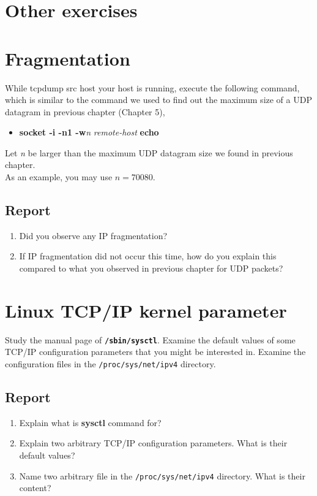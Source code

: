 \documentclass{../UTNetLab}
\begin{document}
\section*{Other exercises}
\section{Fragmentation}
    While tcpdump src host your host is running, execute the following command, which is similar to the command we used to find out the maximum size of a UDP datagram in previous chapter (Chapter 5),
    \begin{itemize}
        \item \textbf{socket -i -n1 -w}\textit{n} \textit{remote-host} \textbf{echo} 
    \end{itemize}
    Let \textit{n} be larger than the maximum UDP datagram size we found in previous chapter. \\
    As an example, you may use $n = 70080$.
    \subsection*{Report}
    \begin{enumerate}
        \item Did you observe any IP fragmentation?
        \item If IP fragmentation did not occur this time, how do you explain this compared to what you observed in previous chapter for UDP packets?
    \end{enumerate}

\section{Linux TCP/IP kernel parameter}
    Study the manual page of \textbf{\texttt{/sbin/sysctl}}.
    Examine the default values of some TCP/IP configuration parameters that you might be interested in.
    Examine the configuration files in the \texttt{/proc/sys/net/ipv4} directory.
    \subsection*{Report}
    \begin{enumerate}
        \item Explain what is \textbf{sysctl} command for?
        \item Explain two arbitrary TCP/IP configuration parameters. What is their default values?
        \item Name two arbitrary file in the \texttt{/proc/sys/net/ipv4} directory. What is their content?
    \end{enumerate}
\end{document}
